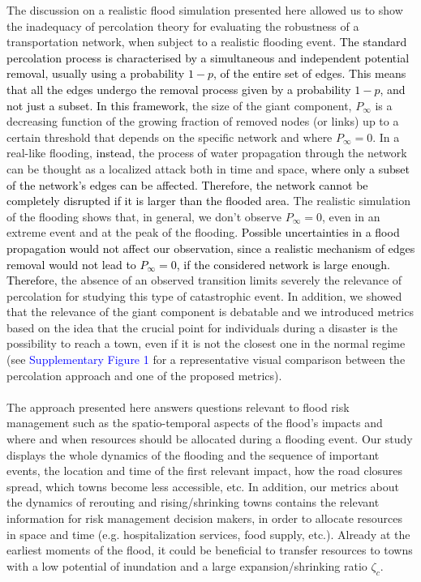 \documentclass[twocolumn,fleqn,10pt]{wlscirep}
\begin{document}
The discussion on a realistic flood simulation presented here allowed us to show the inadequacy of percolation theory for evaluating the robustness of a transportation network, when subject to a realistic flooding event. 
\textcolor{black}{
The standard percolation process is characterised by a simultaneous and independent potential removal, usually using a probability $1-p$, of the entire set of edges. This means that all the edges undergo the removal process given by a probability $1-p$, and not just a subset. In this framework,
}
the size of the giant component, $P_{\infty}$ is a decreasing function of the growing fraction of removed nodes (or links) up to a certain threshold that depends on the specific network and where $P_{\infty}=0$. In a real-like flooding, 
\textcolor{black}{
instead,
}
the process of water propagation through the network can be thought as a localized attack both in time and space, 
\textcolor{black}{
where only a subset of the network’s edges can be affected. Therefore, the network cannot be completely disrupted if it is larger than the flooded area.
}
The realistic simulation of the flooding shows that, in general, we don’t observe $P_{\infty}=0$, even in an extreme event and at the peak of the flooding. 
\textcolor{black}{
Possible uncertainties in a flood propagation would not affect our observation, since a realistic mechanism of edges removal would not lead to $P_{\infty}=0$, if the considered network is large enough. Therefore,
}
the absence of an observed transition limits severely the relevance of percolation for studying this type of catastrophic event. In addition, we showed that the relevance of the giant component is debatable and we introduced metrics based on the idea that the crucial point for individuals during a disaster is the possibility to reach a town, even if it is not the closest one in the normal regime (see \textcolor{blue}{Supplementary Figure 1} for a representative visual comparison between the percolation approach and one of the proposed metrics).
\\
\\
The approach presented here answers questions relevant to flood risk management such as the spatio-temporal aspects of the flood’s impacts and where and when resources should be allocated during a flooding event. Our study displays the whole dynamics of the flooding and the sequence of important events, the location and time of the first relevant impact, how the road closures spread, which towns become less accessible, etc. In addition, our metrics about the dynamics of rerouting and rising/shrinking towns contains the relevant information for risk management decision makers, in order to allocate resources in space and time (e.g. hospitalization services, food supply, etc.). Already at the earliest moments of the flood, it could be beneficial to transfer resources to towns with a low potential of inundation and a large expansion/shrinking ratio $\zeta_c$.
\end{document}
